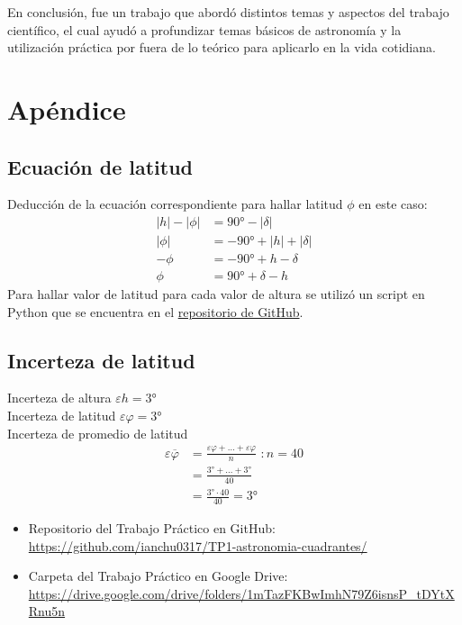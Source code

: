 \documentclass[12pt, a4paper]{article} %
\begin{document}
En conclusión, fue un trabajo que abordó distintos temas y aspectos del trabajo científico, el cual ayudó a profundizar temas básicos de astronomía y la utilización práctica por fuera de lo teórico para aplicarlo en la vida cotidiana.


\section{Apéndice}
\subsection{Ecuación de latitud}
Deducción de la ecuación correspondiente para hallar latitud $\phi$ en este caso:
\begin{align*}
    |h|-|\phi| &= \ang{90}-|\delta| \\
    |\phi| &= -\ang{90}+|h|+|\delta| \\
    -\phi &= -\ang{90} + h - \delta \\
    \phi &= \ang{90} + \delta - h
\end{align*}
Para hallar valor de latitud para cada valor de altura se utilizó un script en Python que se encuentra en el \href{https://github.com/ianchu0317/TP1-astronomia-cuadrantes/tree/main}{repositorio de GitHub}.

\subsection{Incerteza de latitud}
Incerteza de altura $\varepsilon h = \ang{3}$\\[6pt]
Incerteza de latitud $\varepsilon \varphi = \ang{3}$\\[6pt]
Incerteza de promedio de latitud 
\begin{align*}
    \displaystyle \varepsilon \overline{\varphi} &= \frac{\varepsilon \varphi + \dots + \varepsilon \varphi}{n}\,\, : n=40\\[6pt]
    &= \frac{\ang{3} + \dots + \ang{3}}{40}\\[6pt]
    &= \frac{\ang{3} \cdot 40}{40} = \ang{3}
\end{align*}



\vspace{0.5cm}


\begin{itemize}
    \item Repositorio del Trabajo Práctico en GitHub: \url{https://github.com/ianchu0317/TP1-astronomia-cuadrantes/} 
    \item Carpeta del Trabajo Práctico en Google Drive: \url{https://drive.google.com/drive/folders/1mTazFKBwImhN79Z6isnsP_tDYtXRnu5n}
\end{itemize}
\end{document}
